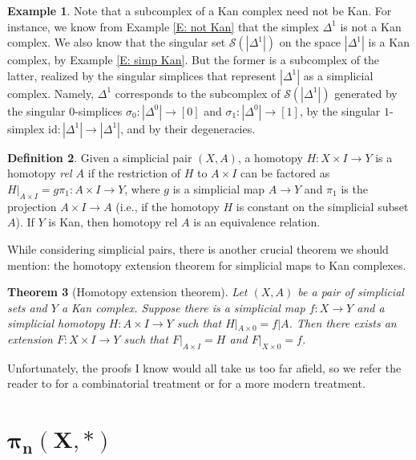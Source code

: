 \documentclass[12pt]{article}
\theoremstyle{plain}
\newtheorem{theorem}{Theorem}[section]
\theoremstyle{definition}
\newtheorem{definition}[theorem]{Definition}
\newtheorem{example}[theorem]{Example}
\newcommand{\ms}[1]{\mathscr{#1}}
\begin{document}
\begin{example}
Note that  a subcomplex of a Kan complex need not be Kan. For instance, we know from Example \ref{E: not Kan} that the simplex $\Delta^1$ is not a Kan complex. We also know that the singular set $\ms S(|\Delta^1|)$ on the space $|\Delta^1|$ is a Kan complex, by Example \ref{E: simp Kan}. But the former is a subcomplex of the latter, realized by the singular simplices that represent $|\Delta^1|$ as a simplicial complex.  Namely, $\Delta^1$ corresponds to the subcomplex of $\ms S(|\Delta^1|)$ generated by the singular $0$-simplices $\sigma_0\colon |\Delta^0|\to [0]$ and $\sigma_1\colon |\Delta^0|\to [1]$, by the singular $1$-simplex $\text{id}\colon |\Delta^1|\to|\Delta^1|$, and by their degeneracies.
\end{example}


\begin{definition}
Given a simplicial pair $(X,A)$, a homotopy $H\colon X\times I\to Y$ is a homotopy \emph{rel $A$} if the restriction of $H$ to $A\times I$ can be factored as $H|_{A\times I}=g\pi_1\colon A\times I\to Y$, where $g$ is a simplicial map $A\to Y$ and $\pi_1$ is the projection $A\times I\to A$ (i.e., if the homotopy $H$ is constant on the simplicial subset $A$). If $Y$ is Kan, then homotopy rel $A$ is an equivalence relation. 
\end{definition}

While considering simplicial pairs, there is another crucial theorem we should mention: the homotopy extension theorem for simplicial maps to Kan complexes.

\begin{theorem}[Homotopy extension theorem]\label{T: HET}
Let $(X,A)$ be a pair of simplicial sets and $Y$  a Kan complex. Suppose there is a simplicial map $f\colon X\to Y$ and a simplicial homotopy $H\colon  A\times I\to Y$ such that $H|_{A\times 0}=f|A$. Then there exists an extension $F\colon X\times I\to Y$ such that $F|_{A\times I}=H$ and $F|_{X\times 0}=f$. 
\end{theorem}

Unfortunately, the proofs I know would all take us too far afield, so we refer the reader to \cite[Chapter 1, Appendix A]{MOORE} for a combinatorial treatment or \cite[Section I.4]{GoeJar} for a more modern treatment.


\section{$\mathbf{\pi_n(X, *)}$}\label{S: pin}
\end{document}

